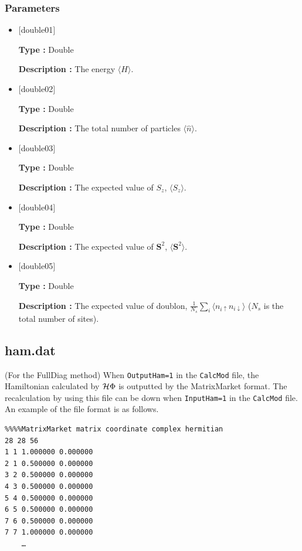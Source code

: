 \subsubsection{Parameters}
 \begin{itemize}

  \item  $[$double01$]$
  
 {\bf Type :} Double

{\bf Description :} The energy $\langle H\rangle$. 
 
  \item $[$double02$]$

 {\bf Type :} Double 

{\bf Description :}  The total number of particles $\langle \hat{n}\rangle$.

  \item $[$double03$]$

 {\bf Type :} Double 

{\bf Description :}  The expected value of $S_z$, $\langle S_z\rangle$. 

  \item $[$double04$]$

 {\bf Type :} Double 

{\bf Description :}  The expected value of ${\bm S^2}$, $\langle {\bm S^2}\rangle$. 

  \item $[$double05$]$

 {\bf Type :} Double 

{\bf Description :}  The expected value of doublon, 
$\frac{1}{N_s} \sum_{i}\langle n_{i\uparrow}n_{i\downarrow}\rangle$ ($N_{s}$ is the total number of sites).


 \end{itemize}

\newpage
\subsection{ham.dat}
\label{Subsec:ham}
(For the FullDiag method) When \verb$OutputHam=1$ in the \verb$CalcMod$ file, the Hamiltonian calculated by $\mathcal{H} \Phi$ is outputted by the MatrixMarket format. The recalculation by using this file can be down when \verb$InputHam=1$ in the \verb$CalcMod$ file.
An example of the file format is as follows.\\

\begin{minipage}{12.5cm}
\begin{screen}
\begin{verbatim}
%%%%MatrixMarket matrix coordinate complex hermitian
28 28 56
1 1 1.000000 0.000000
2 1 0.500000 0.000000
3 2 0.500000 0.000000
4 3 0.500000 0.000000
5 4 0.500000 0.000000
6 5 0.500000 0.000000
7 6 0.500000 0.000000
7 7 1.000000 0.000000
    …
\end{verbatim}
\end{screen}
\end{minipage}

